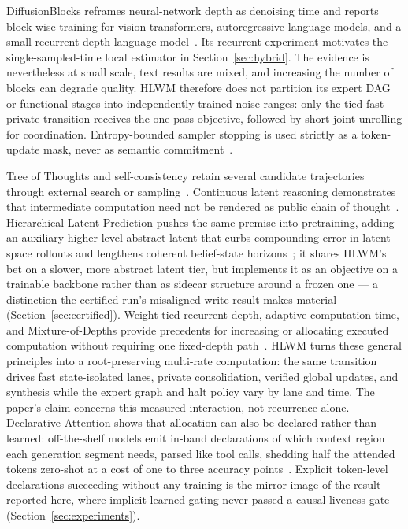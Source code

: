 \documentclass[10pt,a4paper]{article}
\begin{document}
DiffusionBlocks reframes neural-network depth as denoising time and reports
block-wise training for vision transformers, autoregressive language models,
and a small recurrent-depth language model~\cite{shing2025}. Its recurrent
experiment motivates the single-sampled-time local estimator in
Section~\ref{sec:hybrid}. The evidence is nevertheless at small scale, text
results are mixed, and increasing the number of blocks can degrade quality.
HLWM therefore does not partition its expert DAG or functional stages into
independently trained noise ranges: only the tied fast private transition
receives the one-pass objective, followed by short joint unrolling for
coordination. Entropy-bounded sampler stopping is used strictly as a
token-update mask, never as semantic commitment~\cite{benhamu2025}.

Tree of Thoughts and self-consistency retain several candidate trajectories
through external search or sampling~\cite{yao2023,wang2023}. Continuous
latent reasoning demonstrates that intermediate computation need not be
rendered as public chain of thought~\cite{hao2024}. Hierarchical Latent
Prediction pushes the same premise into pretraining, adding an auxiliary
higher-level abstract latent that curbs compounding error in latent-space
rollouts and lengthens coherent belief-state horizons~\cite{hilp2026}; it
shares HLWM's bet on a slower, more abstract latent tier, but implements it
as an objective on a trainable backbone rather than as sidecar structure
around a frozen one --- a distinction the certified run's misaligned-write
result makes material (Section~\ref{sec:certified}). Weight-tied recurrent
depth, adaptive computation time, and Mixture-of-Depths provide precedents
for increasing or allocating executed computation without requiring one
fixed-depth path~\cite{graves2016,dehghani2019,raposo2024}. HLWM turns these
general principles into a root-preserving multi-rate computation: the same
transition drives fast state-isolated lanes, private consolidation, verified
global updates, and synthesis while the expert graph and halt policy vary by
lane and time. The paper's claim concerns this measured interaction, not
recurrence alone. Declarative Attention shows that allocation can also be
declared rather than learned: off-the-shelf models emit in-band declarations
of which context region each generation segment needs, parsed like tool
calls, shedding half the attended tokens zero-shot at a cost of one to three
accuracy points~\cite{da2026}. Explicit token-level declarations succeeding
without any training is the mirror image of the result reported here, where
implicit learned gating never passed a causal-liveness gate
(Section~\ref{sec:experiments}).
\end{document}
